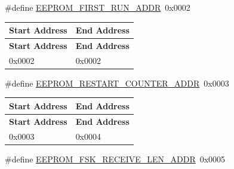 \begin{DoxyCompactItemize}
\#define \hyperlink{group__defines__eeprom__address__map_gaaef7c132060420925a4b03f0763d1c19}{E\+E\+P\+R\+O\+M\+\_\+\+F\+I\+R\+S\+T\+\_\+\+R\+U\+N\+\_\+\+A\+D\+DR}~0x0002
\begin{DoxyCompactList}\small\item\em \tabulinesep=1mm
\begin{longtabu} spread 0pt [c]{*{2}{|X[-1]}|}
\hline
\rowcolor{\tableheadbgcolor}\textbf{ Start Address}&\textbf{ End Address  }\\
\endfirsthead
\hline
\endfoot
\hline
\rowcolor{\tableheadbgcolor}\textbf{ Start Address}&\textbf{ End Address  }\\
\endhead
0x0002&0x0002 \\
\end{longtabu}
\end{DoxyCompactList}\item 
\mbox{\label{group__defines__eeprom__address__map_gad9936577552bbcc87b8a57b75759f01f}} 
\#define \hyperlink{group__defines__eeprom__address__map_gad9936577552bbcc87b8a57b75759f01f}{E\+E\+P\+R\+O\+M\+\_\+\+R\+E\+S\+T\+A\+R\+T\+\_\+\+C\+O\+U\+N\+T\+E\+R\+\_\+\+A\+D\+DR}~0x0003
\begin{DoxyCompactList}\small\item\em \tabulinesep=1mm
\begin{longtabu} spread 0pt [c]{*{2}{|X[-1]}|}
\hline
\rowcolor{\tableheadbgcolor}\textbf{ Start Address}&\textbf{ End Address  }\\
\endfirsthead
\hline
\endfoot
\hline
\rowcolor{\tableheadbgcolor}\textbf{ Start Address}&\textbf{ End Address  }\\
\endhead
0x0003&0x0004 \\
\end{longtabu}
\end{DoxyCompactList}\item 
\mbox{\label{group__defines__eeprom__address__map_gab989de4b765c220d4eaaa36c0d182fd5}} 
\#define \hyperlink{group__defines__eeprom__address__map_gab989de4b765c220d4eaaa36c0d182fd5}{E\+E\+P\+R\+O\+M\+\_\+\+F\+S\+K\+\_\+\+R\+E\+C\+E\+I\+V\+E\+\_\+\+L\+E\+N\+\_\+\+A\+D\+DR}~0x0005
\begin{DoxyCompactList}\small\item\em \tabulinesep=1mm
\begin{longtabu} spread 0pt [c]{*{2}{|X[-1]}|}

\end{longtabu}
\end{DoxyCompactList}
\end{DoxyCompactItemize}

